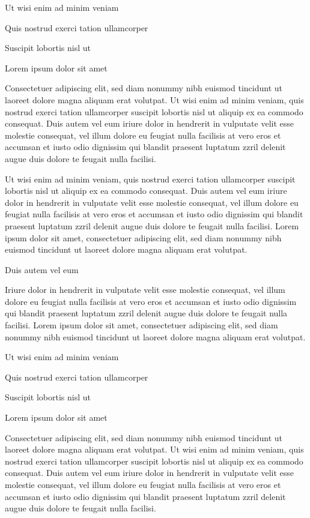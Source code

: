 \documentclass[11pt,twoside]{article}\makeatletter
\begin{document}
Ut wisi enim ad minim veniam\par
Quis nostrud exerci tation ullamcorper \par
Suscipit lobortis nisl ut \par
Lorem ipsum dolor sit amet\par
Consectetuer adipiscing elit, sed diam nonummy nibh euismod tincidunt ut laoreet dolore magna aliquam erat volutpat. Ut wisi enim ad minim veniam, quis nostrud exerci tation ullamcorper suscipit lobortis nisl ut aliquip ex ea commodo consequat. Duis autem vel eum iriure dolor in hendrerit in vulputate velit esse molestie consequat, vel illum dolore eu feugiat nulla facilisis at vero eros et accumsan et iusto odio dignissim qui blandit praesent luptatum zzril delenit augue duis dolore te feugait nulla facilisi.\par
Ut wisi enim ad minim veniam, quis nostrud exerci tation ullamcorper suscipit lobortis nisl ut aliquip ex ea commodo consequat. Duis autem vel eum iriure dolor in hendrerit in vulputate velit esse molestie consequat, vel illum dolore eu feugiat nulla facilisis at vero eros et accumsan et iusto odio dignissim qui blandit praesent luptatum zzril delenit augue duis dolore te feugait nulla facilisi. Lorem ipsum dolor sit amet, consectetuer adipiscing elit, sed diam nonummy nibh euismod tincidunt ut laoreet dolore magna aliquam erat volutpat. \par
Duis autem vel eum \par
Iriure dolor in hendrerit in vulputate velit esse molestie consequat, vel illum dolore eu feugiat nulla facilisis at vero eros et accumsan et iusto odio dignissim qui blandit praesent luptatum zzril delenit augue duis dolore te feugait nulla facilisi. Lorem ipsum dolor sit amet, consectetuer adipiscing elit, sed diam nonummy nibh euismod tincidunt ut laoreet dolore magna aliquam erat volutpat. \par
Ut wisi enim ad minim veniam\par
Quis nostrud exerci tation ullamcorper \par
Suscipit lobortis nisl ut \par
Lorem ipsum dolor sit amet\par
Consectetuer adipiscing elit, sed diam nonummy nibh euismod tincidunt ut laoreet dolore magna aliquam erat volutpat. Ut wisi enim ad minim veniam, quis nostrud exerci tation ullamcorper suscipit lobortis nisl ut aliquip ex ea commodo consequat. Duis autem vel eum iriure dolor in hendrerit in vulputate velit esse molestie consequat, vel illum dolore eu feugiat nulla facilisis at vero eros et accumsan et iusto odio dignissim qui blandit praesent luptatum zzril delenit augue duis dolore te feugait nulla facilisi.\par
\end{document}
